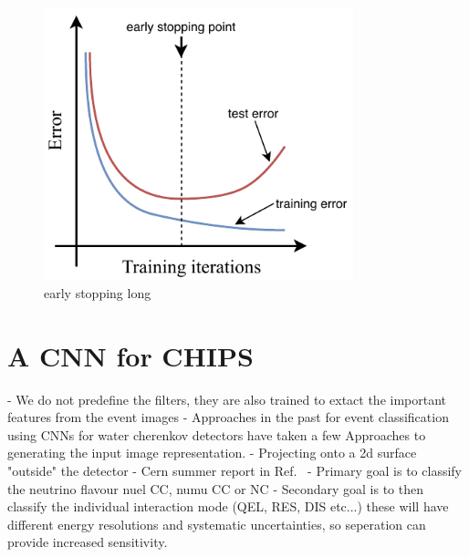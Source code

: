 \begin{figure} %
    \includegraphics[width=0.8\textwidth]{diagrams/6-cvn/early_stopping.pdf}
    \caption[early stopping short]
    {early stopping long}
    \label{fig:early_stopping}
\end{figure} %


\section{A CNN for CHIPS}
\label{sec:cvn_cnn_for_chips}
- We do not predefine the filters, they are also trained to extact the important features from the event images
- Approaches in the past for event classification using CNNs for water cherenkov detectors have taken a few Approaches to generating the input image representation.
- Projecting onto a 2d surface "outside" the detector
- Cern summer report in Ref.~\cite{theodore2016}
- Primary goal is to classify the neutrino flavour nuel CC, numu CC or NC
- Secondary goal is to then classify the individual interaction mode (QEL, RES, DIS etc...) these will have different energy resolutions and systematic uncertainties, so seperation can provide increased sensitivity.

